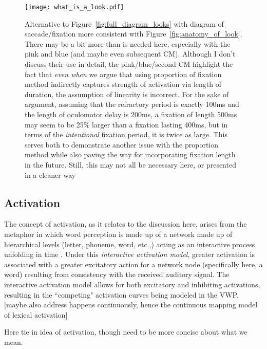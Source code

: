 \begin{figure}
\centering
\texttt{[image: what\_is\_a\_look.pdf]}
\caption{Alternative to Figure~\ref{fig:full_diagram_looks} with diagram of saccade/fixation more consistent with Figure~\ref{fig:anatomy_of_look}. There may be a bit more than is needed here, especially with the pink and blue (and maybe even subsequent CM). Although I don't discuss their use in detail, the pink/blue/second CM highlight the fact that \textit{even when} we argue that using proportion of fixation method indirectly captures strength of activation via length of duration, the assumption of linearity is incorrect. For the sake of argument, assuming that the refractory period is exactly 100ms and the length of oculomotor delay is 200ms, a fixation of length 500ms may seem to be 25\% larger than a fixation lasting 400ms, but in terms of the \textit{intentional} fixation period, it is twice as large. This serves both to demonstrate another issue with the proportion method while also paving the way for incorporating fixation length in the future. Still, this may not all be necessary here, or presented in a cleaner way} 
\label{fig:whats_in_a_look}
\end{figure}

\subsection{Activation}

The concept of activation, as it relates to the discussion here, arises from the metaphor in which word perception is made up of a network made up of hierarchical levels (letter, phoneme, word, etc.,) acting as an interactive process unfolding in time \cite{McClelland1981}. Under this \textit{interactive activation model}, greater activation is associated with a greater excitatory action for a network node (specifically here, a word) resulting from consistency with the received auditory signal. The interactive activation model allows for both excitatory and inhibiting activations, resulting in the ``competing" activation curves being modeled in the VWP. [maybe also address happens continuously, hence the continuous mapping model of lexical activation]

Here tie in idea of activation, though need to be more concise about what we mean. 

